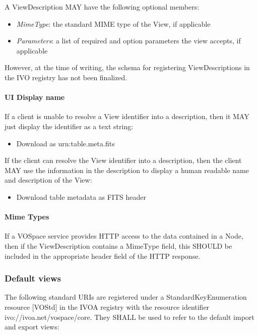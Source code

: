 \documentclass[11pt,a4paper]{ivoa}
\begin{document}
A ViewDescription MAY have the following optional members:

\begin{itemize}
    \item \emph{MimeType}: the standard MIME type of the View, if applicable
    \item \emph{Parameters}: a list of required and option parameters the view accepts, if applicable
\end{itemize}

However, at the time of writing, the schema for registering ViewDescriptions in the IVO registry has not been finalized.

\paragraph{UI Display name}
If a client is unable to resolve a View identifier into a description, then it MAY just display the identifier as a text string:

\begin{itemize}
    \item Download as urn:table.meta.fits
\end{itemize}

If the client can resolve the View identifier into a description, then the client MAY use the information in the description to display a human readable name and description of the View:

\begin{itemize}
    \item Download table metadata as FITS header
\end{itemize}

\paragraph{Mime Types}
If a VOSpace service provides HTTP access to the data contained in a Node, then if the ViewDescription contains a MimeType field, this SHOULD be included in the appropriate header field of the HTTP response.

\subsubsection{Default views}
\label{subsubsec:default views}
The following standard URIs are registered under a StandardKeyEnumeration resource [VOStd] in the IVOA registry with the resource identifier ivo://ivoa.net/vospace/core. They SHALL be used to refer to the default import and export views:
\end{document}
